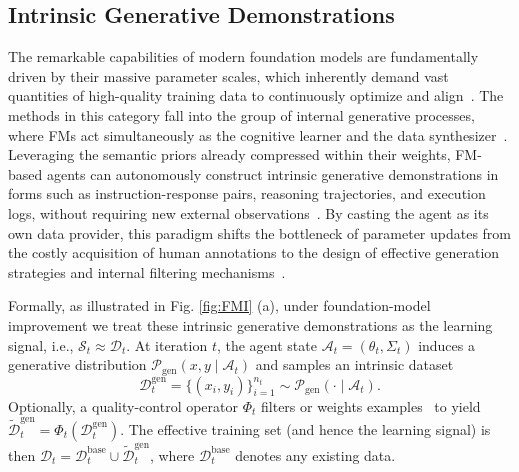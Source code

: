 \documentclass{article}
\begin{document}
\subsection{Intrinsic Generative Demonstrations}
\label{sec:Intrinsic_Generative_Demonstrations}
\label{sec:Self_Generated_Data}

The remarkable capabilities of modern foundation models are fundamentally driven by their massive parameter scales, which inherently demand vast quantities of high-quality training data to continuously optimize and align~\citep{zhao2024selfguidebettertaskspecificinstruction, gan2025theoreticalunderstandingsyntheticdata}. The methods in this category fall into the group of internal generative processes, where FMs act simultaneously as the cognitive learner and the data synthesizer~\citep{zhao2024selfguidebettertaskspecificinstruction, zweiger2025selfadapting}. Leveraging the  semantic priors already compressed within their weights, FM-based agents can autonomously construct intrinsic generative demonstrations in forms such as instruction-response pairs, reasoning trajectories, and execution logs, without requiring new external observations~\citep{zhao2024selfguidebettertaskspecificinstruction, shi2025taskcraft, simonds2025ladder}. By casting the agent as its own data provider, this paradigm shifts the bottleneck of parameter updates from the costly acquisition of human annotations to the design of effective generation strategies and internal filtering mechanisms~\citep{qin2025dive}. 

Formally, as illustrated in Fig. \ref{fig:FMI} (a), under foundation-model improvement we treat these intrinsic generative demonstrations as the learning signal, i.e., $\mathcal{S}_t \approx \mathcal{D}_t$. At iteration $t$, the agent state $\mathcal{A}_t=(\theta_t,\Sigma_t)$ induces a generative distribution $\mathcal{P}_{\mathrm{gen}}(x,y \mid \mathcal{A}_t)$ and samples an intrinsic dataset
\begin{equation}
\mathcal{D}^{\mathrm{gen}}_t=\{(x_i,y_i)\}_{i=1}^{n_t}\sim \mathcal{P}_{\mathrm{gen}}(\cdot\mid \mathcal{A}_t).
\end{equation}
Optionally, a quality-control operator $\Phi_t$ filters or weights examples~\citep{jiang2025importance} to yield
$\tilde{\mathcal{D}}^{\mathrm{gen}}_t=\Phi_t(\mathcal{D}^{\mathrm{gen}}_t)$. The effective training set (and hence the learning signal) is then
$\mathcal{D}_t=\mathcal{D}^{\mathrm{base}}_t\cup \tilde{\mathcal{D}}^{\mathrm{gen}}_t$,
where $\mathcal{D}^{\mathrm{base}}_t$ denotes any existing data.
\end{document}
